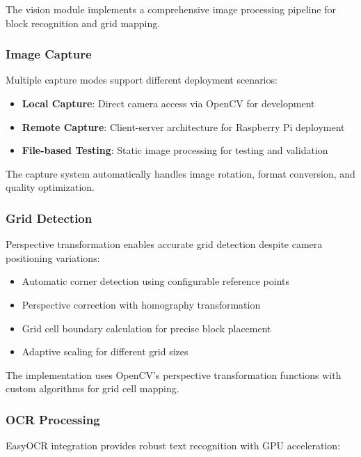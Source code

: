 The vision module implements a comprehensive image processing pipeline for block recognition and grid mapping.

\subsubsection{Image Capture}

Multiple capture modes support different deployment scenarios:

\begin{itemize}
    \item \textbf{Local Capture}: Direct camera access via OpenCV for development
    \item \textbf{Remote Capture}: Client-server architecture for Raspberry Pi deployment
    \item \textbf{File-based Testing}: Static image processing for testing and validation
\end{itemize}

The capture system automatically handles image rotation, format conversion, and quality optimization.

\subsubsection{Grid Detection}

Perspective transformation enables accurate grid detection despite camera positioning variations:

\begin{itemize}
    \item Automatic corner detection using configurable reference points
    \item Perspective correction with homography transformation
    \item Grid cell boundary calculation for precise block placement
    \item Adaptive scaling for different grid sizes
\end{itemize}

The implementation uses OpenCV's perspective transformation functions with custom algorithms for grid cell mapping.

\subsubsection{OCR Processing}

EasyOCR integration provides robust text recognition with GPU acceleration:

